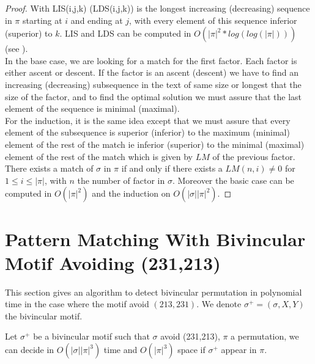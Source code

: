 \documentclass[a4paper]{llncs}
\newcommand{\ptext}{\pi}
\newcommand{\pmotif}{\sigma}
\newcounter{num}
\newcommand{\x}{X}
\newcommand{\y}{Y}
\newcommand{\bmotif}{(\sigma,\x,\y)}
\newcommand{\pbmotif}{\pmotif^+}
\begin{document}
\begin{proof}
With LIS(i,j,k) (LDS(i,j,k)) is the longest increasing (decreasing) sequence in $\ptext$ starting at $i$ and ending at $j$,
with every element of this sequence
inferior (superior) to $k$. 
LIS and LDS can be computed in $O(|\ptext|^2*log(log(|\ptext|)))$ (see \cite{Bespamyatnikh00enumeratinglongest}).\\
			
In the base case, 
we are looking for a match for the first factor.
Each factor is either ascent or descent.
If the factor is an ascent (descent)
we have to find an increasing (decreasing) subsequence
in the text of same size or longest that 
the size of the factor,
and to find the optimal solution 
we must assure that the last element
of the sequence is minimal (maximal).\\
For the induction, it is the same idea
except that we must assure that 
every element of the subsequence is superior (inferior)
to the maximum (minimal) element of the rest of the match
ie inferior (superior) to the minimal (maximal) element of the rest of the match
which is given by $LM$ of
the previous factor.\\

There exists a match of $\pmotif$ in $\ptext$ if and only if
there exists a $LM(n,i)\neq 0$ for $1 \leq i \leq |\ptext|$,
with $n$ the number of factor in $\pmotif$.
Moreover the basic case can be computed in $O(|\ptext|^2)$
and the induction on $O(|\pmotif||\ptext|^2)$.
\end{proof}
					

\section{Pattern Matching With Bivincular Motif Avoiding (231,213)}	
\label{section:bivincular}

This section gives an algorithm to detect bivincular permutation in polynomial time in the case where the motif avoid $(213,231)$.
We denote $\pbmotif=\bmotif$ the bivincular motif.
 
\begin{proposition}
Let $\pbmotif$ be a bivincular motif such that $\pmotif$
avoid (231,213), 
$\ptext$ a permutation,
we can decide in $O(|\pmotif||\ptext|^3)$ time
and $O(|\ptext|^3)$ space
if $\pbmotif$
appear in $\ptext$.
\end{proposition}
					
\end{document}
